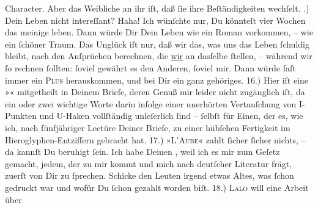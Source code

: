 \begin{ledgroupsized}[t]{13cm}
               Character. Aber das Weibliche an ihr iſt, daß ſie ihre Beſtändigkeiten wechſelt.\pend
           .) Dein Leben nicht intereſſant? Haha! Ich wünſchte nur, Du könnteſt vier Wochen
               das  meinige leben. {\pb}Dann würde  Dir Dein Leben wie ein Roman vorkommen, – wie ein ſchöner Traum. Das Unglück
               iſt nur, daß \strikeout{\textcolor{gray}{m}} wir das, was uns das Leben ſchuldig bleibt, nach den Anſprüchen berechnen, die
                  \uline{wir} an dasſelbe ſtellen, – während wir ſo rechnen
               ſollten: ſoviel gewährt es den Anderen, ſoviel mir. Dann würde faſt immer ein \textsc{Plus} herauskommen, und bei Dir ein ganz gehöriges.\pend
           \pstart
           {\pb}16.) Hier iſt eine »\label{K_L02774-9v}\label{K_L02774-9h}« mitgetheilt in Deinem Briefe, deren Genuß mir leider nicht zugänglich iſt,
               da ein oder zwei wichtige Worte darin infolge einer unerhörten Vertauſchung von
               I-Punkten und U-Haken vollſtändig unleſerlich ſind – ſelbſt für Einen, der  es, wie ich, nach fünfjähriger Lectüre
               Deiner Briefe, zu einer hübſchen Fertigkeit im Hieroglyphen-Entziffern gebracht
               hat.\pend
           \pstart
           {\pb}17.) »\textsc{L’Aube}« zahlt ſicher ſicher nichts, – da kannſt Du beruhigt ſein. Ich habe Deinen
                  \label{K_L02774-10v}\label{K_L02774-10h}, weil ich es mir zum Geſetz \strikeout{\textcolor{gray}{ma}} gemacht, jedem, der zu mir kommt und mich nach deutſcher Literatur frägt,
               zuerſt von Dir zu ſprechen. Schicke den Leuten irgend etwas Altes, was ſchon gedruckt war und wofür
               Du ſchon gezahlt worden biſt.\pend
           \pstart
           {\pb}18.) \textsc{Lalo} will eine Arbeit über \label{K_L02774-11v}
\end{ledgroupsized}
